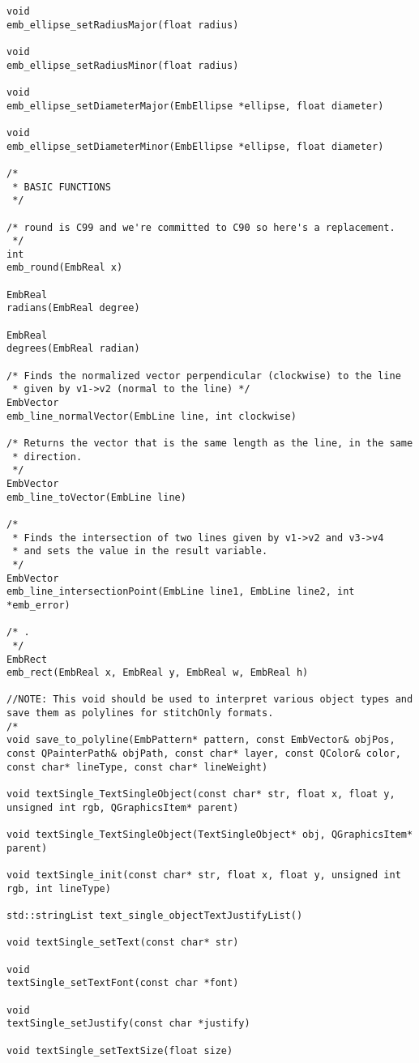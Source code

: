 \begin{lstlisting}
void
emb_ellipse_setRadiusMajor(float radius)

void
emb_ellipse_setRadiusMinor(float radius)

void
emb_ellipse_setDiameterMajor(EmbEllipse *ellipse, float diameter)

void
emb_ellipse_setDiameterMinor(EmbEllipse *ellipse, float diameter)

/*
 * BASIC FUNCTIONS
 */

/* round is C99 and we're committed to C90 so here's a replacement.
 */
int
emb_round(EmbReal x)

EmbReal
radians(EmbReal degree)

EmbReal
degrees(EmbReal radian)

/* Finds the normalized vector perpendicular (clockwise) to the line
 * given by v1->v2 (normal to the line) */
EmbVector
emb_line_normalVector(EmbLine line, int clockwise)

/* Returns the vector that is the same length as the line, in the same
 * direction.
 */
EmbVector
emb_line_toVector(EmbLine line)

/*
 * Finds the intersection of two lines given by v1->v2 and v3->v4
 * and sets the value in the result variable.
 */
EmbVector
emb_line_intersectionPoint(EmbLine line1, EmbLine line2, int *emb_error)

/* .
 */
EmbRect
emb_rect(EmbReal x, EmbReal y, EmbReal w, EmbReal h)

//NOTE: This void should be used to interpret various object types and save them as polylines for stitchOnly formats.
/*
void save_to_polyline(EmbPattern* pattern, const EmbVector& objPos, const QPainterPath& objPath, const char* layer, const QColor& color, const char* lineType, const char* lineWeight)

void textSingle_TextSingleObject(const char* str, float x, float y, unsigned int rgb, QGraphicsItem* parent)

void textSingle_TextSingleObject(TextSingleObject* obj, QGraphicsItem* parent)

void textSingle_init(const char* str, float x, float y, unsigned int rgb, int lineType)

std::stringList text_single_objectTextJustifyList()

void textSingle_setText(const char* str)

void
textSingle_setTextFont(const char *font)

void
textSingle_setJustify(const char *justify)

void textSingle_setTextSize(float size)


\end{lstlisting}
